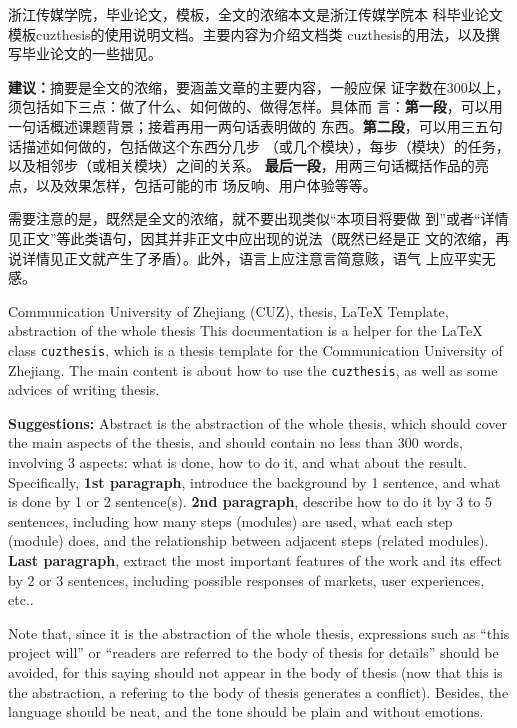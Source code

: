 \begin{chineseabstract}
    {浙江传媒学院，毕业论文，模板，全文的浓缩}本文是浙江传媒学院本
    科毕业论文模板cuzthesis的使用说明文档。主要内容为介绍文档类
    cuzthesis的用法，以及撰写毕业论文的一些拙见。

    \begin{leftbar}
        \noindent\textbf{建议：}摘要是全文的浓缩，要涵盖文章的主要内容，一般应保
        证字数在300以上，须包括如下三点：做了什么、如何做的、做得怎样。具体而
        言：\textbf{第一段}，可以用一句话概述课题背景；接着再用一两句话表明做的
        东西。\textbf{第二段}，可以用三五句话描述如何做的，包括做这个东西分几步
        （或几个模块），每步（模块）的任务，以及相邻步（或相关模块）之间的关系。
        \textbf{最后一段}，用两三句话概括作品的亮点，以及效果怎样，包括可能的市
        场反响、用户体验等等。
        
        \noindent{}需要注意的是，既然是全文的浓缩，就不要出现类似“本项目将要做
        到”或者“详情见正文”等此类语句，因其并非正文中应出现的说法（既然已经是正
        文的浓缩，再说详情见正文就产生了矛盾）。此外，语言上应注意言简意赅，语气
        上应平实无感。
    \end{leftbar}
\end{chineseabstract}
\begin{englishabstract}
    {Communication University of Zhejiang (CUZ), thesis, \LaTeX{} Template,
    abstraction of the whole thesis} This documentation is a helper for the
    \LaTeX{} class \texttt{cuzthesis}, which is a thesis template for the
    Communication University of Zhejiang. The main content is about how to use
    the \texttt{cuzthesis}, as well as some advices of writing thesis.

    \begin{leftbar}
        \noindent\textbf{Suggestions:} Abstract is the abstraction of the whole
        thesis, which should cover the main aspects of the thesis, and should
        contain no less than 300 words, involving 3 aspects: what is done, how
        to do it, and what about the result. Specifically, \textbf{1st
        paragraph}, introduce the background by 1 sentence, and what is done by
        1 or 2 sentence(s). \textbf{2nd paragraph}, describe how to do it by 3
        to 5 sentences, including how many steps (modules) are used, what each
        step (module) does, and the relationship between adjacent steps (related
        modules). \textbf{Last paragraph}, extract the most important features
        of the work and its effect by 2 or 3 sentences, including possible
        responses of markets, user experiences, etc..
    	
    	\noindent Note that, since it is the abstraction of the whole thesis,
    	expressions such as ``this project will'' or ``readers are referred to
    	the body of thesis for details'' should be avoided, for this saying
    	should not appear in the body of thesis (now that this is the
    	abstraction, a refering to the body of thesis generates a conflict).
    	Besides, the language should be neat, and the tone should be plain and
    	without emotions.
    \end{leftbar}
\end{englishabstract}